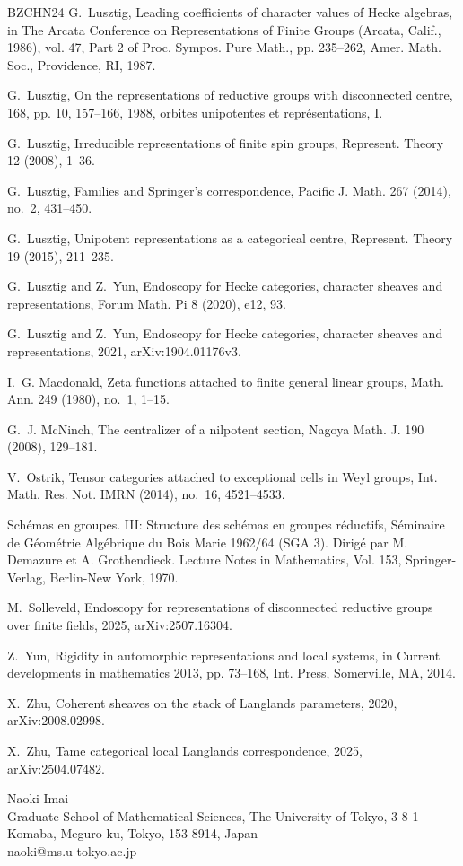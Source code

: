 \documentclass[12pt,a4paper]{article}
\begin{document}
\begin{thebibliography}{BZCHN24}
	G.~Lusztig, Leading coefficients of character values of {H}ecke algebras, in
	The {A}rcata {C}onference on {R}epresentations of {F}inite {G}roups
	({A}rcata, {C}alif., 1986), vol. 47, Part 2 of Proc. Sympos. Pure Math., pp.
	235--262, Amer. Math. Soc., Providence, RI, 1987.
	
	G.~Lusztig, On the representations of reductive groups with disconnected
	centre, 168, pp. 10, 157--166, 1988, orbites unipotentes et
	repr\'{e}sentations, I.
	
	G.~Lusztig, Irreducible representations of finite spin groups, Represent.
	Theory 12 (2008), 1--36.
	
	G.~Lusztig, Families and {S}pringer's correspondence, Pacific J. Math. 267
	(2014), no.~2, 431--450.
	
	G.~Lusztig, Unipotent representations as a categorical centre, Represent.
	Theory 19 (2015), 211--235.
	
	G.~Lusztig and Z.~Yun, Endoscopy for {H}ecke categories, character sheaves and
	representations, Forum Math. Pi 8 (2020), e12, 93.
	
	G.~Lusztig and Z.~Yun, Endoscopy for {H}ecke categories, character sheaves and
	representations, 2021, arXiv:1904.01176v3.
	
	I.~G. Macdonald, Zeta functions attached to finite general linear groups, Math.
	Ann. 249 (1980), no.~1, 1--15.
	
	G.~J. McNinch, The centralizer of a nilpotent section, Nagoya Math. J. 190
	(2008), 129--181.
	
	V.~Ostrik, Tensor categories attached to exceptional cells in {W}eyl groups,
	Int. Math. Res. Not. IMRN  (2014), no.~16, 4521--4533.
	
	Sch\'emas en groupes. {III}: {S}tructure des sch\'emas en groupes r\'eductifs,
	S\'eminaire de G\'eom\'etrie Alg\'ebrique du Bois Marie 1962/64 (SGA 3).
	Dirig\'e par M. Demazure et A. Grothendieck. Lecture Notes in Mathematics,
	Vol. 153, Springer-Verlag, Berlin-New York, 1970.
	
	M.~Solleveld, Endoscopy for representations of disconnected reductive groups
	over finite fields, 2025, arXiv:2507.16304.
	
	Z.~Yun, Rigidity in automorphic representations and local systems, in Current
	developments in mathematics 2013, pp. 73--168, Int. Press, Somerville, MA,
	2014.
	
	X.~Zhu, Coherent sheaves on the stack of Langlands parameters, 2020,
	arXiv:2008.02998.
	
	X.~Zhu, Tame categorical local Langlands correspondence, 2025,
	arXiv:2504.07482.
	
\end{thebibliography}


\noindent
Naoki Imai\\
Graduate School of Mathematical Sciences, The University of Tokyo, 
3-8-1 Komaba, Meguro-ku, Tokyo, 153-8914, Japan \\
naoki@ms.u-tokyo.ac.jp\\
\end{document}
